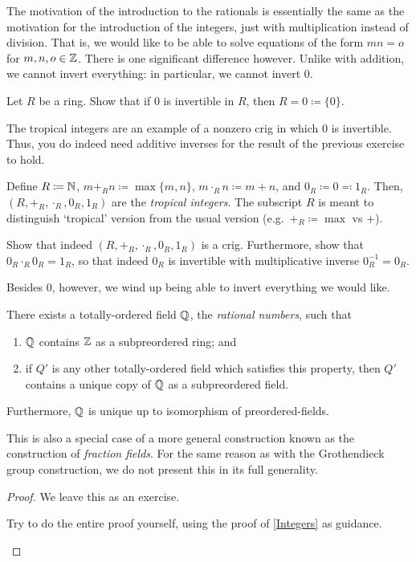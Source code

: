 The motivation of the introduction to the rationals is essentially the same as the motivation for the introduction of the integers, just with multiplication instead of division.  That is, we would like to be able to solve equations of the form $mn=o$ for $m,n,o\in \mathbb{Z}$.  There is one significant difference however.  Unlike with addition, we cannot invert everything:  in particular, we cannot invert $0$.
\begin{exr}
Let $R$ be a ring.  Show that if $0$ is invertible in $R$, then $R=0\coloneqq \{ 0\}$.
\end{exr}
\begin{exm}\label{exm1.3.2}
The tropical integers are an example of a nonzero crig in which $0$ is invertible.  Thus, you do indeed need additive inverses for the result of the previous exercise to hold.

Define $R\coloneqq \mathbb{N}$, $m+_Rn\coloneqq \max \{ m,n\}$, $m\cdot _Rn\coloneqq m+n$, and $0_R\coloneqq 0\eqqcolon 1_R$.  Then, $(R,+_R,\cdot _R,0_R,1_R)$ are the \emph{tropical integers}.  The subscript $R$ is meant to distinguish `tropical' version from the usual version (e.g.~$+_R\coloneqq \max$ vs $+$).
\begin{exr}
Show that indeed $(R,+_R,\cdot _R,0_R,1_R)$ is a crig.  Furthermore, show that $0_R\cdot _R0_R=1_R$, so that indeed $0_R$ is invertible with multiplicative inverse $0_R^{-1}=0_R$.
\end{exr}
\end{exm}
Besides $0$, however, we wind up being able to invert everything we would like.
\begin{thm}\label{RationalNumbers}
There exists a totally-ordered field $\mathbb{Q}$, the \emph{rational numbers}, such that
\begin{enumerate}
\item \label{enm1.3.2.i}$\mathbb{Q}$ contains $\mathbb{Z}$ as a subpreordered ring; and
\item \label{enm1.3.2.ii}if $Q'$ is any other totally-ordered field which satisfies this property, then $Q'$ contains a unique copy of $\mathbb{Q}$ as a subpreordered field.
\end{enumerate}
Furthermore, $\mathbb{Q}$ is unique up to isomorphism of preordered-fields.
\begin{rmk}
This is also a special case of a more general construction known as the construction of \emph{fraction fields}.  For the same reason as with the Grothendieck group construction, we do not present this in its full generality.
\end{rmk}
\begin{proof}
We leave this as an exercise.
\begin{exr}
Try to do the entire proof yourself, using the proof of \cref{Integers} as guidance.
\end{exr}
\end{proof}
\end{thm}
